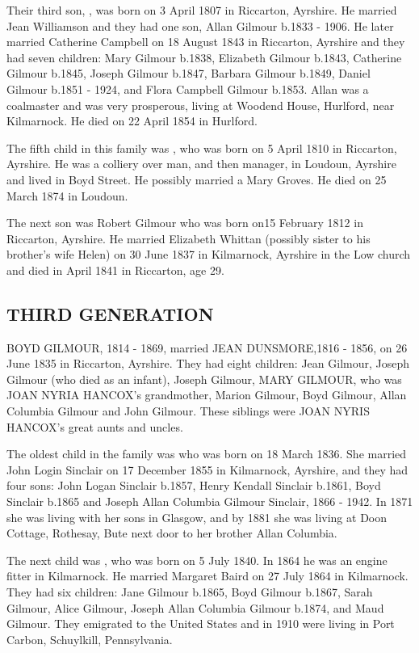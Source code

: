 {Their third son, , was born on 3 April 1807 in Riccarton, Ayrshire. He married Jean Williamson and they had one son, Allan Gilmour b.1833 - 1906.  He later married Catherine Campbell on 18 August 1843 in Riccarton, Ayrshire and they had seven children: Mary Gilmour b.1838, Elizabeth Gilmour b.1843, Catherine Gilmour b.1845, Joseph Gilmour b.1847, Barbara Gilmour b.1849, Daniel Gilmour b.1851 - 1924, and Flora Campbell Gilmour b.1853.  Allan was a coalmaster and was very prosperous, living at Woodend House, Hurlford, near Kilmarnock.  He died on 22 April 1854 in Hurlford.

The fifth child in this family was , who was born on 5 April 1810 in Riccarton, Ayrshire. He was a colliery over man, and then manager, in Loudoun, Ayrshire and lived in Boyd Street. He possibly married a Mary Groves.  He died 
on 25 March 1874 in Loudoun.

The next son was Robert Gilmour  who was born on15 February 1812 in Riccarton, Ayrshire. He married Elizabeth Whittan (possibly sister to his brother's wife Helen) on 30 June 1837 in Kilmarnock, Ayrshire in the Low church and died in April 1841 in Riccarton, age 29.

\subsection{THIRD GENERATION}

\uppercase{Boyd Gilmour}, 1814 - 1869, married \uppercase{Jean Dunsmore},1816 - 1856, on 26 June 1835 in Riccarton, Ayrshire.  They had eight children:  Jean Gilmour, Joseph Gilmour (who died as an infant), Joseph Gilmour, \uppercase{Mary Gilmour}, who was \uppercase{Joan Nyria Hancox}'s grandmother, Marion Gilmour, Boyd Gilmour, Allan Columbia Gilmour and John Gilmour. These siblings were \uppercase{Joan Nyris Hancox}'s great aunts and uncles.

The oldest child in the family was  who was born on 18 March 1836. She married John Login Sinclair on 17 December 1855 in Kilmarnock, Ayrshire, and they had four sons: John Logan Sinclair b.1857, Henry Kendall Sinclair b.1861, 
Boyd Sinclair b.1865 and Joseph Allan Columbia Gilmour Sinclair, 1866 - 1942.  In 1871 she was living with her sons in Glasgow, and by 1881 she was living at Doon Cottage, Rothesay, Bute next door to her brother Allan Columbia.

The next child was , who was born on 5 July 1840. In 1864 he was an engine fitter in Kilmarnock. He married Margaret Baird on 27 July 1864 in Kilmarnock. They had six children: Jane Gilmour b.1865, Boyd Gilmour b.1867, Sarah Gilmour, Alice Gilmour, Joseph Allan Columbia Gilmour b.1874, and Maud Gilmour. They emigrated to the United States and in 1910 were living in Port Carbon, Schuylkill, Pennsylvania.

}
